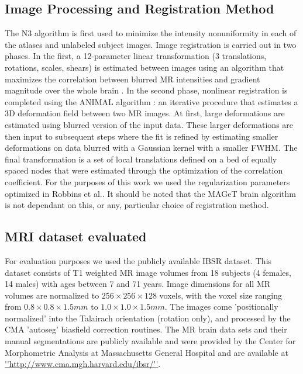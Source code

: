 \documentclass{article}
\begin{document}
\subsection{Image Processing and Registration Method}
The N3 algorithm \cite{Sled1998} is first used to minimize the intensity
nonuniformity in each of the atlases and unlabeled subject images.  Image
registration is carried out in two phases.  In the first, a 12-parameter linear
transformation (3 translations, rotations, scales, shears) is estimated between
images using an algorithm that maximizes the correlation between blurred MR
intensities and gradient magnitude over the whole brain \cite{Collins}.  In the
second phase, nonlinear registration is completed using the ANIMAL algorithm
\cite{Collins1995}: an iterative procedure that estimates a 3D deformation
field between two MR images. At first, large deformations are estimated using
blurred version of the input data. These larger deformations are then input to
subsequent steps where the fit is refined by estimating smaller deformations on
data blurred with a Gaussian kernel with a smaller FWHM. The final
transformation is a set of local translations defined on a bed of equally
spaced nodes that were estimated through the optimization of the correlation
coefficient. For the purposes of this work we used the regularization
parameters optimized in Robbins et al.\cite{Robbins2004}. It should be
noted that the MAGeT brain algorithm is not dependant on this, or any,
particular choice of registration method\cite{Chakravarty2011}.

\subsection{MRI dataset evaluated}

For evaluation purposes we used the publicly available IBSR dataset.  This
dataset consists of T1 weighted MR image volumes from 18 subjects (4 females,
14 males) with ages between 7 and 71 years. Image dimensions for all MR volumes
are normalized to  $256  \times 256 \times 128$ voxels, with the voxel size
ranging from $0.8 \times 0.8 \times 1.5 mm$ to $1.0 \times 1.0 \times 1.5 mm$.
The images come 'positionally normalized' into the Talairach orientation
(rotation only), and processed by the CMA 'autoseg' biasfield correction
routines. The MR brain data sets and their manual segmentations are publicly
available and were provided by the Center for Morphometric Analysis at
Massachusetts General Hospital and are available at
\url{''http://www.cma.mgh.harvard.edu/ibsr/''}. 
\end{document}
